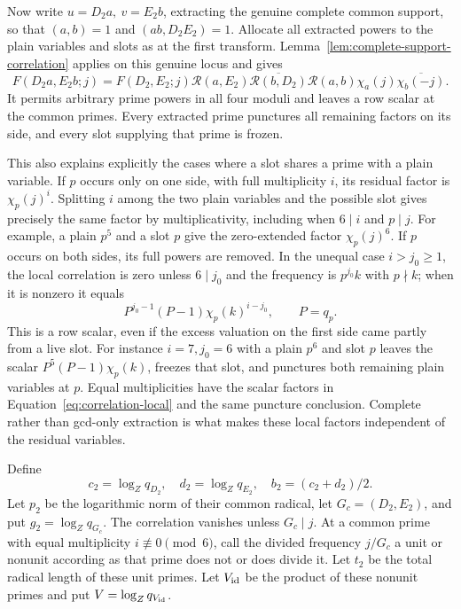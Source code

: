 \documentclass[12pt]{article}
\begin{document}
Now write \(u=D_2a,\ v=E_2b\), extracting the genuine complete
common support, so that \((a,b)=1\) and \((ab,D_2E_2)=1\).
Allocate all extracted powers to the plain variables and slots as at the
first transform.  Lemma~\ref{lem:complete-support-correlation} applies on
this genuine locus and gives
\[
 F(D_2a,E_2b;j)=F(D_2,E_2;j)\mathcal R(a,E_2)
   \overline{\mathcal R(b,D_2)}\mathcal R(a,b)
   \chi_a(j)\overline{\chi_b(-j)}.
\]
It permits arbitrary prime powers in all four moduli and leaves a row
scalar at the common primes.  Every extracted prime punctures all
remaining factors on its side, and every slot supplying that prime is
frozen.

This also explains explicitly the cases where a slot shares a
prime with a plain variable.  If \(p\) occurs only on one side, with
full multiplicity \(i\), its residual factor is
\(\chi_p(j)^i\).  Splitting \(i\) among the two plain variables and
the possible slot gives precisely the same factor by multiplicativity,
including when \(6\mid i\) and \(p\mid j\).  For example, a plain
\(p^5\) and a slot \(p\) give the zero-extended factor
\(\chi_p(j)^6\).  If \(p\) occurs on both sides, its full powers are
removed.  In the unequal case \(i>j_0\ge1\), the local correlation
is zero unless \(6\mid j_0\) and the frequency is \(p^{j_0}k\)
with \(p\nmid k\); when it is nonzero it equals
\[
 P^{j_0-1}(P-1)\chi_p(k)^{i-j_0},\qquad P=q_p.
\]
This is a row scalar, even if the excess valuation on the first side
came partly from a live slot.  For instance \(i=7,j_0=6\) with a
plain \(p^6\) and slot \(p\) leaves the scalar
\(P^5(P-1)\chi_p(k)\), freezes that slot, and punctures both
remaining plain variables at \(p\).  Equal multiplicities have the
scalar factors in Equation~\eqref{eq:correlation-local} and the
same puncture conclusion.  Complete rather than gcd-only extraction
is what makes these local factors independent of the residual
variables.

Define
\[
 c_2=\log_Zq_{D_2},\quad d_2=\log_Zq_{E_2},\quad
 b_2=(c_2+d_2)/2.
\]
Let \(p_2\) be the logarithmic norm of their common radical,
let \(G_c=(D_2,E_2)\), and put \(g_2=\log_Zq_{G_c}\).
The correlation vanishes unless \(G_c\mid j\).  At a common
prime with equal multiplicity \(i\not\equiv0\pmod6\), call the
divided frequency \(j/G_c\) a unit or nonunit according as that
prime does not or does divide it.  Let \(t_2\) be the total
radical length of these unit primes.  Let \(V_{\rm id}\) be
the product of these nonunit primes and put
\(V=\log_Zq_{V_{\rm id}}\).
\end{document}

